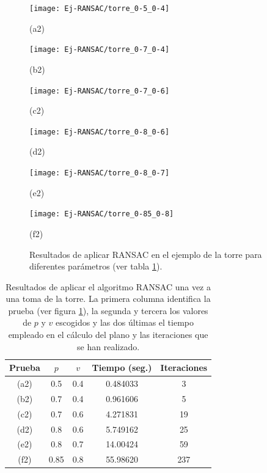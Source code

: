 \begin{figure}[h!]
	\begin{minipage}[b]{0.5\textwidth}
		\centering
		\texttt{[image: Ej-RANSAC/torre\_0-5\_0-4]} 
		\caption*{(a2)}
	\end{minipage}
	\begin{minipage}[b]{0.5\textwidth}
		\centering
		\texttt{[image: Ej-RANSAC/torre\_0-7\_0-4]} 
		\caption*{(b2)}
	\end{minipage}
	\begin{minipage}[b]{0.5\textwidth}
		\centering
		\texttt{[image: Ej-RANSAC/torre\_0-7\_0-6]} 
		\caption*{(c2)}
	\end{minipage}
	\begin{minipage}[b]{0.5\textwidth}
		\centering
		\texttt{[image: Ej-RANSAC/torre\_0-8\_0-6]} 
		\caption*{(d2)}
	\end{minipage}		
	\begin{minipage}[b]{0.5\textwidth}
		\centering
		\texttt{[image: Ej-RANSAC/torre\_0-8\_0-7]} 
		\caption*{(e2)}
	\end{minipage}
	\begin{minipage}[b]{0.5\textwidth}
		\centering
		\texttt{[image: Ej-RANSAC/torre\_0-85\_0-8]} 
		\caption*{(f2)}
	\end{minipage}	
	
	\caption{Resultados de aplicar RANSAC en el ejemplo de la torre para diferentes parámetros (ver tabla \ref{table:RANSACtorreTable}). }
	\label{fig:RANSACtorre}
\end{figure}

\begin{table}[h!]
	\centering
	\begin{tabular}{| c | c | c || c | c |} 
		\hline
		Prueba & $ p $ & $ v $ & Tiempo (seg.) & Iteraciones \\
		\hline
		(a2) & 0.5 & 0.4 & 0.484033 & 3 \\		
		(b2) & 0.7 & 0.4 & 0.961606 & 5  \\	
		(c2) & 0.7 & 0.6 & 4.271831 &  19 \\
		(d2) & 0.8 & 0.6 & 5.749162 & 25\\
		(e2) & 0.8 & 0.7 & 14.00424 & 59 \\
		(f2) & 0.85 & 0.8 & 55.98620 & 237\\
		\hline
	\end{tabular}
	\caption{Resultados de aplicar el algoritmo RANSAC una vez a una toma de  la torre. La primera columna identifica la prueba (ver figura \ref{fig:RANSACtorre}), la segunda y tercera los valores de $ p $ y $ v $ escogidos y las dos últimas el tiempo empleado en el cálculo del plano y las iteraciones que se han realizado.}
	\label{table:RANSACtorreTable}
\end{table}

